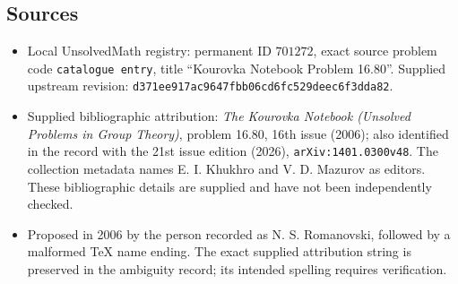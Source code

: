 \documentclass[11pt]{article}
\begin{document}
\subsection{Sources}
\begin{itemize}
\item Local UnsolvedMath registry: permanent ID \(701272\), exact source problem code \texttt{catalogue entry}, title ``Kourovka Notebook Problem 16.80''. Supplied upstream revision: \texttt{d371ee917ac9647fbb06cd6fc529deec6f3dda82}.
\item Supplied bibliographic attribution: \emph{The Kourovka Notebook (Unsolved Problems in Group Theory)}, problem 16.80, 16th issue (2006); also identified in the record with the 21st issue edition (2026), \texttt{arXiv:1401.0300v48}. The collection metadata names E. I. Khukhro and V. D. Mazurov as editors. These bibliographic details are supplied and have not been independently checked.
\item Proposed in 2006 by the person recorded as N. S. Romanovski, followed by a malformed TeX name ending. The exact supplied attribution string is preserved in the ambiguity record; its intended spelling requires verification.
\end{itemize}
\end{document}
